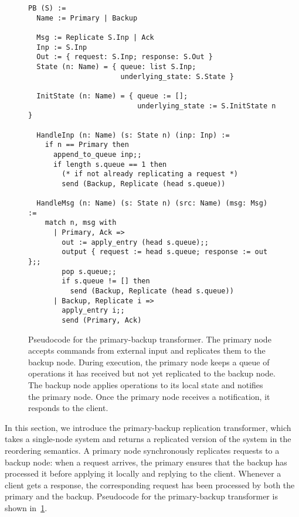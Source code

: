 \begin{figure}[t]
  \centering
  \begin{lstlisting}[language=caml,basicstyle=\scriptsize\tt,morekeywords={output,send,nop}]
PB (S) :=
  Name := Primary | Backup

  Msg := Replicate S.Inp | Ack
  Inp := S.Inp
  Out := { request: S.Inp; response: S.Out }
  State (n: Name) = { queue: list S.Inp;
                      underlying_state: S.State }

  InitState (n: Name) = { queue := [];
                          underlying_state := S.InitState n }

  HandleInp (n: Name) (s: State n) (inp: Inp) :=
    if n == Primary then
      append_to_queue inp;;
      if length s.queue == 1 then
        (* if not already replicating a request *)
        send (Backup, Replicate (head s.queue))

  HandleMsg (n: Name) (s: State n) (src: Name) (msg: Msg) :=
    match n, msg with
      | Primary, Ack =>
        out := apply_entry (head s.queue);;
        output { request := head s.queue; response := out };;
        pop s.queue;;
        if s.queue != [] then
          send (Backup, Replicate (head s.queue))
      | Backup, Replicate i =>
        apply_entry i;;
        send (Primary, Ack)

  \end{lstlisting}

  \caption{Pseudocode for the primary-backup transformer. The primary node
    accepts commands from external input and replicates them to the backup
    node.  During execution, the primary node keeps a queue of operations
    it has received but not yet replicated to the backup node. The backup
    node applies operations to its local state and notifies the primary node.
    Once the primary node receives a notification, it responds to the client.}

\label{fig:pbj-code}
\end{figure}

In this section, we introduce the primary-backup replication transformer,
which takes a single-node system and returns a replicated version of the
system in the reordering semantics. A primary node synchronously replicates
requests to a backup node: when a request arrives, the primary ensures that
the backup has processed it before applying it locally and replying to the
client. Whenever a client gets a response, the corresponding request has
been processed by both the primary and the backup. Pseudocode for the
primary-backup transformer is shown in~\cref{fig:pbj-code}.

